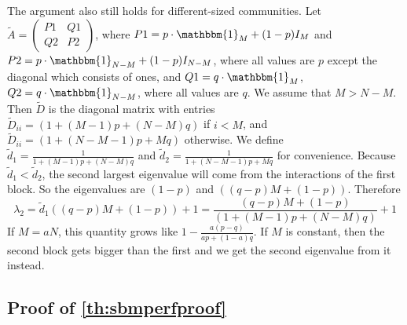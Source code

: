 The argument also still holds for different-sized communities. Let $\tilde{A}=\begin{pmatrix}
    P1&Q1\\Q2&P2
\end{pmatrix}$, where $P1=p\cdot\mathbbm{1}_{M} + (1-p)I_{M}$ and $P2=p\cdot\mathbbm{1}_{N-M} + (1-p)I_{N-M}$, where all values are $p$ except the diagonal which consists of ones, and $Q1=q\cdot\mathbbm{1}_{M}$, $Q2=q\cdot\mathbbm{1}_{N-M}$, where all values are $q$. We assume that $M > N-M$.
Then $\tilde{D}$ is the diagonal matrix with entries $\tilde{D}_{ii} = (1+(M-1)p + (N-M)q)$ if $i<M$, and $\tilde{D}_{ii} = (1+(N-M-1)p + Mq)$ otherwise. We define $\tilde{d}_1=\frac{1}{1+(M-1)p + (N-M)q}$ and $\tilde{d}_2=\frac{1}{1+(N-M-1)p + Mq}$ for convenience. Because $\tilde{d}_1 < \tilde{d}_2$, the second largest eigenvalue will come from the interactions of the first block. So the eigenvalues are $(1-p)$ and $((q-p)M+(1-p))$. Therefore
 $$\lambda_2 = \tilde{d}_1((q-p)M+(1-p)) + 1
= \frac{(q-p)M+(1-p)}{(1+(M-1)p + (N-M)q)} + 1
$$
If $M= a N$, this quantity grows like $1-\frac{a(p-q)}{ap + (1-a)q}$. If $M$ is constant, then the second block gets bigger than the first and we get the second eigenvalue from it instead.

\subsection{Proof of \autoref{th:sbmperfproof}}


